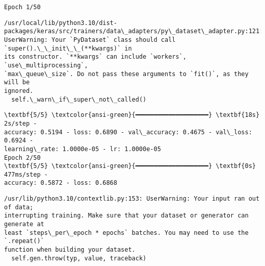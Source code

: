 \documentclass[11pt]{article}
\begin{document}
    \begin{Verbatim}[commandchars=\\\{\}]
Epoch 1/50
    \end{Verbatim}

    \begin{Verbatim}[commandchars=\\\{\}]
/usr/local/lib/python3.10/dist-
packages/keras/src/trainers/data\_adapters/py\_dataset\_adapter.py:121:
UserWarning: Your `PyDataset` class should call `super().\_\_init\_\_(**kwargs)` in
its constructor. `**kwargs` can include `workers`, `use\_multiprocessing`,
`max\_queue\_size`. Do not pass these arguments to `fit()`, as they will be
ignored.
  self.\_warn\_if\_super\_not\_called()
    \end{Verbatim}

    \begin{Verbatim}[commandchars=\\\{\}]
\textbf{5/5} \textcolor{ansi-green}{━━━━━━━━━━━━━━━━━━━━} \textbf{18s} 2s/step -
accuracy: 0.5194 - loss: 0.6890 - val\_accuracy: 0.4675 - val\_loss: 0.6924 -
learning\_rate: 1.0000e-05 - lr: 1.0000e-05
Epoch 2/50
\textbf{5/5} \textcolor{ansi-green}{━━━━━━━━━━━━━━━━━━━━} \textbf{0s} 477ms/step -
accuracy: 0.5872 - loss: 0.6868
    \end{Verbatim}

    \begin{Verbatim}[commandchars=\\\{\}]
/usr/lib/python3.10/contextlib.py:153: UserWarning: Your input ran out of data;
interrupting training. Make sure that your dataset or generator can generate at
least `steps\_per\_epoch * epochs` batches. You may need to use the `.repeat()`
function when building your dataset.
  self.gen.throw(typ, value, traceback)
    \end{Verbatim}
\end{document}
